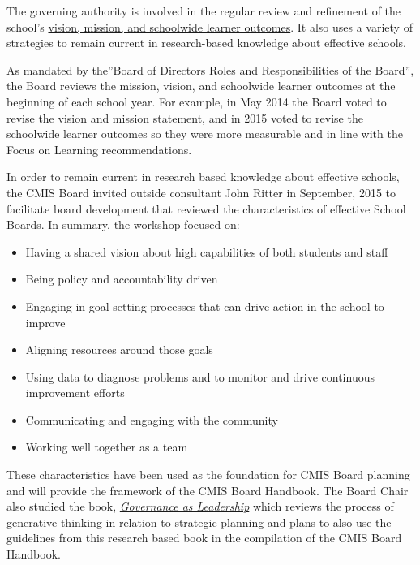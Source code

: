 \begin{findings}

The governing authority is involved in the regular review and refinement of the school’s \href{http://cmis.ac.th/about/vision}{vision, mission, and schoolwide learner outcomes}. It also uses a variety of strategies to remain current in research-based knowledge about effective schools.

As mandated by the”Board of Directors Roles and Responsibilities of the Board”, the Board reviews the mission, vision, and schoolwide learner outcomes at the beginning of each school year. For example, in May 2014 the Board voted to revise the vision and mission statement, and in 2015 voted to revise the schoolwide learner outcomes so they were more measurable and in line with the Focus on Learning recommendations. 

In order to remain current in research based knowledge about effective schools, the CMIS Board invited outside consultant John Ritter in September, 2015 to facilitate board development  that reviewed the characteristics of effective School Boards. In summary, the workshop focused on:

\begin{itemize}
\item Having a shared vision about high capabilities of both students and staff
\item Being policy and accountability driven
\item Engaging in goal-setting processes that can drive action in the school to improve
\item Aligning resources around those goals
\item Using data to diagnose problems and to monitor and drive continuous improvement efforts
\item Communicating and engaging with the community
\item Working well together as a team 
\end{itemize}

These characteristics have been used as the foundation for CMIS Board planning and will provide the framework of the CMIS Board Handbook. The Board Chair also studied the book, \href{https://www.amazon.com/Governance-Leadership-Reframing-Nonprofit-Boards/dp/0471684201}{\textit{Governance as Leadership}}  which reviews the process of generative thinking in relation to strategic planning and plans to also use the guidelines from this research based book in the compilation of the CMIS Board Handbook.


\end{findings}
